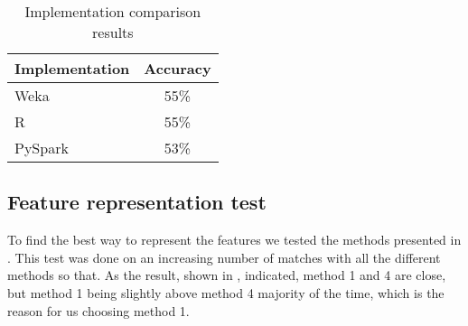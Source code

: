 \begin{table}[!htb]
  \centering
  \begin{tabular}{|l|c|}
    \hline
    Implementation  & Accuracy  \\
    \hline
    Weka & 55\%  \\
    R & 55\%\\
    PySpark & 53\%\\ 
    \hline
  \end{tabular}
  \caption{Implementation comparison results}
  \label{tab:impl_results}
\end{table}

\FloatBarrier
\subsection{Feature representation test}
To find the best way to represent the features we tested the methods presented in . This test was done on an increasing number of matches with all the different methods so that. As the result, shown in , indicated, method 1 and 4 are close, but method 1 being slightly above method 4 majority of the time, which is the reason for us choosing method 1.

